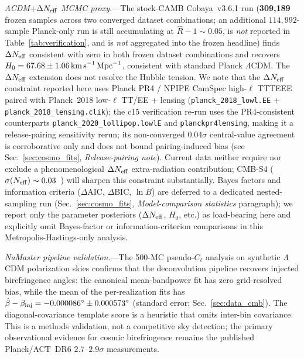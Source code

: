 \documentclass[aps,prd,twocolumn,superscriptaddress,showpacs,preprintnumbers,nofootinbib,longbibliography,floatfix]{revtex4-2}
\newcommand{\Neff}{N_{\rm eff}}
\begin{document}
\textit{$\Lambda$CDM$+\Delta\Neff$ MCMC proxy.}---The stock-CAMB Cobaya~v3.6.1
run (\textbf{309{,}189} frozen samples across two converged dataset
combinations; an additional $114{,}992$-sample Planck-only run is still
accumulating at $\hat R - 1 \sim 0.05$, is \emph{not} reported in
Table~\ref{tab:verification}, and is \emph{not} aggregated into the frozen headline)
finds $\Delta\Neff$ consistent with zero in both frozen
dataset combinations and recovers $H_0 = 67.68\pm 1.06\,\text{km\,s}^{-1}\,
\text{Mpc}^{-1}$, consistent with standard Planck $\Lambda$CDM. The
$\Delta\Neff$ extension does not resolve the Hubble tension. We note
that the $\Delta\Neff$ constraint reported here uses Planck PR4 / NPIPE
CamSpec high-$\ell$ TTTEEE paired with Planck~2018 low-$\ell$ TT/EE +
lensing (\texttt{planck\_2018\_lowl.EE} + \texttt{planck\_2018\_lensing.clik});
the c15 verification re-run uses the PR4-consistent counterparts
\texttt{planck\_2020\_lollipop.lowlE} and \texttt{planckpr4lensing},
making it a release-pairing sensitivity rerun; its non-converged $0.04\sigma$
central-value agreement is corroborative only and does not bound
pairing-induced bias (see Sec.~\ref{sec:cosmo_fits},
\emph{Release-pairing note}).
Current data
neither require nor exclude a phenomenological $\Delta\Neff$
extra-radiation contribution; CMB-S4
($\sigma(\Neff)\sim 0.03$~\cite{CMBS4_ScienceBook}) will sharpen this
constraint substantially.
Bayes factors and information criteria ($\Delta$AIC, $\Delta$BIC, $\ln B$) are deferred to a dedicated nested-sampling run (Sec.~\ref{sec:cosmo_fits}, \emph{Model-comparison statistics} paragraph); we report only the parameter posteriors ($\Delta N_{\rm eff}$, $H_0$, etc.) as load-bearing here and explicitly omit Bayes-factor or information-criterion comparisons in this Metropolis-Hastings-only analysis.

\textit{NaMaster pipeline validation.}---The 500-MC pseudo-$C_\ell$ analysis on
synthetic $\Lambda$CDM polarization skies confirms that the deconvolution pipeline recovers
injected birefringence angles: the canonical mean-bandpower fit has zero
grid-resolved bias, while the mean of the per-realization fits has
$\hat\beta-\beta_{\rm inj}=-0.000086^\circ\pm0.000573^\circ$ (standard error;
Sec.~\ref{sec:data_cmb}). The diagonal-covariance template score is a heuristic
that omits inter-bin covariance. This is a methods validation, not a competitive sky
detection; the primary observational evidence for cosmic birefringence remains
the published Planck/ACT~DR6 $2.7$--$2.9\sigma$ measurements.
\end{document}
